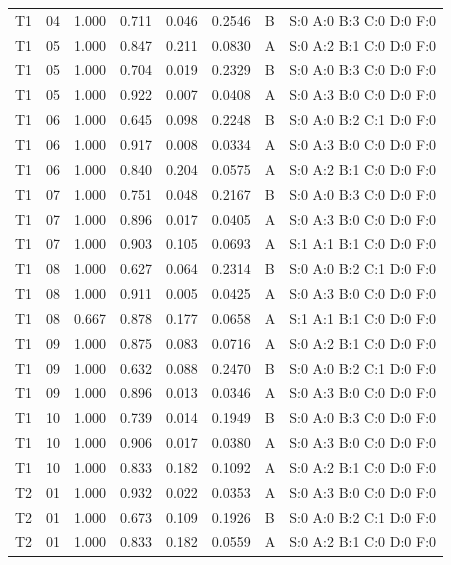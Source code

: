 \begin{longtable}{lrrrrrll}
T1 & 04 & 1.000 & 0.711 & 0.046 & 0.2546 & B & \tiny S:0 A:0 B:3 C:0 D:0 F:0 \\
T1 & 05 & 1.000 & 0.847 & 0.211 & 0.0830 & A & \tiny S:0 A:2 B:1 C:0 D:0 F:0 \\
T1 & 05 & 1.000 & 0.704 & 0.019 & 0.2329 & B & \tiny S:0 A:0 B:3 C:0 D:0 F:0 \\
T1 & 05 & 1.000 & 0.922 & 0.007 & 0.0408 & A & \tiny S:0 A:3 B:0 C:0 D:0 F:0 \\
T1 & 06 & 1.000 & 0.645 & 0.098 & 0.2248 & B & \tiny S:0 A:0 B:2 C:1 D:0 F:0 \\
T1 & 06 & 1.000 & 0.917 & 0.008 & 0.0334 & A & \tiny S:0 A:3 B:0 C:0 D:0 F:0 \\
T1 & 06 & 1.000 & 0.840 & 0.204 & 0.0575 & A & \tiny S:0 A:2 B:1 C:0 D:0 F:0 \\
T1 & 07 & 1.000 & 0.751 & 0.048 & 0.2167 & B & \tiny S:0 A:0 B:3 C:0 D:0 F:0 \\
T1 & 07 & 1.000 & 0.896 & 0.017 & 0.0405 & A & \tiny S:0 A:3 B:0 C:0 D:0 F:0 \\
T1 & 07 & 1.000 & 0.903 & 0.105 & 0.0693 & A & \tiny S:1 A:1 B:1 C:0 D:0 F:0 \\
T1 & 08 & 1.000 & 0.627 & 0.064 & 0.2314 & B & \tiny S:0 A:0 B:2 C:1 D:0 F:0 \\
T1 & 08 & 1.000 & 0.911 & 0.005 & 0.0425 & A & \tiny S:0 A:3 B:0 C:0 D:0 F:0 \\
T1 & 08 & 0.667 & 0.878 & 0.177 & 0.0658 & A & \tiny S:1 A:1 B:1 C:0 D:0 F:0 \\
T1 & 09 & 1.000 & 0.875 & 0.083 & 0.0716 & A & \tiny S:0 A:2 B:1 C:0 D:0 F:0 \\
T1 & 09 & 1.000 & 0.632 & 0.088 & 0.2470 & B & \tiny S:0 A:0 B:2 C:1 D:0 F:0 \\
T1 & 09 & 1.000 & 0.896 & 0.013 & 0.0346 & A & \tiny S:0 A:3 B:0 C:0 D:0 F:0 \\
T1 & 10 & 1.000 & 0.739 & 0.014 & 0.1949 & B & \tiny S:0 A:0 B:3 C:0 D:0 F:0 \\
T1 & 10 & 1.000 & 0.906 & 0.017 & 0.0380 & A & \tiny S:0 A:3 B:0 C:0 D:0 F:0 \\
T1 & 10 & 1.000 & 0.833 & 0.182 & 0.1092 & A & \tiny S:0 A:2 B:1 C:0 D:0 F:0 \\
T2 & 01 & 1.000 & 0.932 & 0.022 & 0.0353 & A & \tiny S:0 A:3 B:0 C:0 D:0 F:0 \\
T2 & 01 & 1.000 & 0.673 & 0.109 & 0.1926 & B & \tiny S:0 A:0 B:2 C:1 D:0 F:0 \\
T2 & 01 & 1.000 & 0.833 & 0.182 & 0.0559 & A & \tiny S:0 A:2 B:1 C:0 D:0 F:0 \\

\end{longtable}
